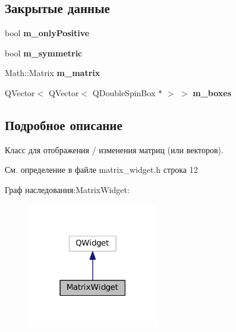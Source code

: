 \subsection*{Закрытые данные}
\begin{DoxyCompactItemize}
\item 
\hypertarget{class_matrix_widget_a82f2f645dfe6a61844cbcaa7b9d74c5f}{}\label{class_matrix_widget_a82f2f645dfe6a61844cbcaa7b9d74c5f} 
bool {\bfseries m\+\_\+only\+Positive}
\item 
\hypertarget{class_matrix_widget_ad3c5c9a7eb76b52d92ff88e5aac69df8}{}\label{class_matrix_widget_ad3c5c9a7eb76b52d92ff88e5aac69df8} 
bool {\bfseries m\+\_\+symmetric}
\item 
\hypertarget{class_matrix_widget_a45e4733316b0de574c8f333e3f89bd4c}{}\label{class_matrix_widget_a45e4733316b0de574c8f333e3f89bd4c} 
Math\+::\+Matrix {\bfseries m\+\_\+matrix}
\item 
\hypertarget{class_matrix_widget_ab3a0c3c5c847e0a35aa23a6a7e7d56f6}{}\label{class_matrix_widget_ab3a0c3c5c847e0a35aa23a6a7e7d56f6} 
Q\+Vector$<$ Q\+Vector$<$ Q\+Double\+Spin\+Box $\ast$ $>$ $>$ {\bfseries m\+\_\+boxes}
\end{DoxyCompactItemize}


\subsection{Подробное описание}
Класс для отображения / изменения матриц (или векторов). 

См. определение в файле matrix\+\_\+widget.\+h строка 12



Граф наследования\+:Matrix\+Widget\+:
\nopagebreak
\begin{figure}[H]
\begin{center}
\leavevmode
\includegraphics[width=162pt]{class_matrix_widget__inherit__graph}
\end{center}
\end{figure}


